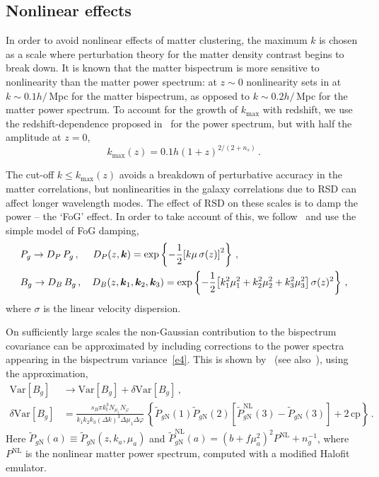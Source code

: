 \subsection{Nonlinear effects}
%
%
In order to avoid nonlinear effects of matter clustering, the maximum $k$ is chosen as a scale where perturbation theory for the matter density contrast begins to break down. It is known that the matter bispectrum is more sensitive to nonlinearity than the matter power spectrum: at $z\sim 0$ nonlinearity sets in at $k\sim 0.1h/\,$Mpc for the matter bispectrum, as opposed to $k\sim 0.2h/\,$Mpc for the matter power spectrum. To account for the growth of $k_{\mathrm{max}}$ with redshift, we use the redshift-dependence proposed in~\cite{Smith:2002dz} for the power spectrum, but with half the amplitude at $z=0$,
\begin{equation}\label{kmax}
k_\mathrm{max}(z) = {0.1h}\left(1+z\right)^{2/(2+n_{s})}\,.
\end{equation}

The cut-off $k\leq k_\mathrm{max}(z)$ avoids a breakdown of perturbative accuracy in the matter correlations, but nonlinearities in the galaxy correlations due to RSD can affect longer wavelength modes. The effect of RSD on these scales is to damp the power -- the `FoG' effect. In order to take account of this, we follow~\cite{Karagiannis:2018jdt,Yankelevich:2018uaz} and use the simple model of FoG damping,
\begin{align}
&P_g \to  D_P\, P_g\,,\quad~ D_{P}(z, \bm{k}) = \exp\left\{-\frac{1}{2}{\left[k\mu\,\sigma(z)\right]^{2}}\right\}\,, \\
&B_g \to  D_B\, B_g\,,  \quad D_{B}(z, \bm {k}_1,\bm {k}_2,\bm {k}_3) = \exp\left\{-\frac{1}{2}{\left[k_{1}^{2}\mu_{1}^{2}+k_{2}^{2}\mu_{2}^{2}+k_{3}^{2}\mu_{3}^{2}\right]\sigma(z)^{2}}\right\}\,, \label{e13}
\end{align}
where $\sigma$ is the linear velocity dispersion.

On sufficiently large scales the non-Gaussian contribution to the bispectrum covariance can be  approximated by including corrections to the power spectra appearing in the bispectrum variance~\eqref{e4}. This is shown by~\cite{Chan:2016ehg} (see also~\cite{Karagiannis:2018jdt}), using the approximation,
\begin{align}
\mathrm{Var} [B_{g}] &\to \mathrm{Var} [B_{g}]+ \delta \mathrm{Var} [B_{g}] \,, \\
\delta \mathrm{Var} [B_{g}] &= \frac{s_B\pi k_\mathrm{f}^3 N_{\mu_1} N_\varphi}{k_1 k_2 k_3 (\Delta k)^3\Delta \mu_1 \Delta \varphi}\, \left\{ \tilde{P}_{g \mathrm{N}}(1) \tilde{P}_{g \mathrm{N}}(2) \left[ \tilde{P}^\mathrm{NL}_{g \mathrm{N}}(3) - \tilde{P}_{g\mathrm{N}}(3) \right] + 2 \, \mbox{cp} \right\}\,.
\label{e4x}
\end{align}
Here $\tilde{P}_{g \mathrm{N}}(a) \equiv \tilde{P}_{g \mathrm{N}}(z,k_a,\mu_a)$ and $\tilde{P}^{\mathrm{NL}}_{g{\mathrm{N}}}(a) = (b + f \mu_a^2)^2 P^\mathrm{NL} + n_g^{-1}$, where $P^{\mathrm{NL}}$ is the nonlinear matter power spectrum, computed with a modified Halofit emulator.
%
%
